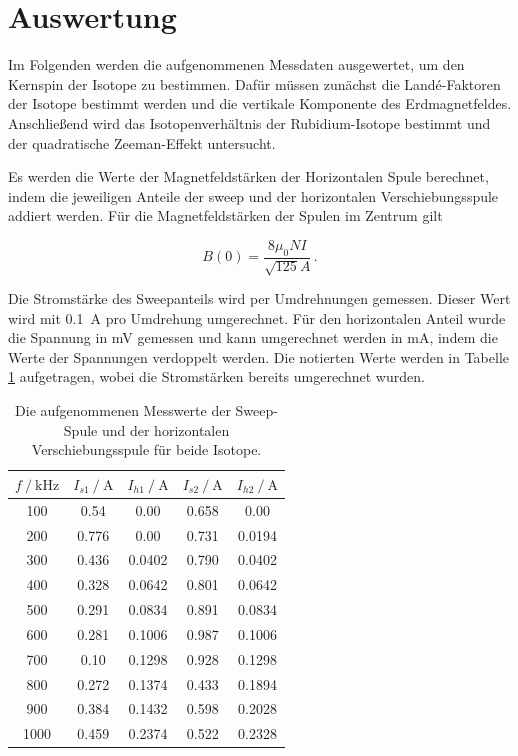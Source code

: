 \section{Auswertung}
\label{sec:auswertung}

Im Folgenden werden die aufgenommenen Messdaten ausgewertet, um den Kernspin der Isotope zu bestimmen.
Dafür müssen zunächst die Landé-Faktoren der Isotope bestimmt werden und die vertikale Komponente des Erdmagnetfeldes.
Anschließend wird das Isotopenverhältnis der Rubidium-Isotope bestimmt und der quadratische Zeeman-Effekt untersucht.

Es werden die Werte der Magnetfeldstärken der Horizontalen Spule berechnet, indem die jeweiligen Anteile der sweep und der
horizontalen Verschiebungsspule addiert werden.
Für die Magnetfeldstärken der Spulen im Zentrum gilt

\begin{equation}
    B(0) = \frac{8  \mu_0  N I}{\sqrt{125} A}  \, .
    \label{eqn:magnetfeld}
\end{equation}

Die Stromstärke des Sweepanteils wird per Umdrehnungen gemessen.
Dieser Wert wird mit \qty{0.1}{\ampere} pro Umdrehung umgerechnet.
Für den horizontalen Anteil wurde die Spannung in \unit{\milli\volt} gemessen und kann umgerechnet werden in \unit{\milli\ampere},
indem die Werte der Spannungen verdoppelt werden.
Die notierten Werte werden in Tabelle \ref{tab:magnetfeldstärken} aufgetragen, wobei die Stromstärken bereits umgerechnet wurden.

\begin{table}
    \centering
    \caption{Die aufgenommenen Messwerte der Sweep-Spule und der horizontalen Verschiebungsspule für beide Isotope.}
    \label{tab:magnetfeldstärken}
    \begin{tabular}{c c c c c}
        \toprule
        $f \mathbin{/} \mathrm{kHz} $& $I_{s1} \mathbin{/} \unit{\ampere}$ & $I_{h1} \mathbin{/} \unit{\ampere}$ & $I_{s2} \mathbin{/} \unit{\ampere}$ & $I_{h2} \mathbin{/} \unit{\ampere}$ \\
        \midrule
        100 & 0.54 & 0.00 & 0.658 & 0.00 \\
        200 & 0.776 & 0.00 & 0.731 & 0.0194 \\
        300 & 0.436 & 0.0402 & 0.790 & 0.0402 \\
        400 & 0.328 & 0.0642 & 0.801 & 0.0642 \\
        500 & 0.291 & 0.0834 & 0.891 & 0.0834 \\
        600 & 0.281 & 0.1006 & 0.987 & 0.1006 \\
        700 & 0.10 & 0.1298 & 0.928 & 0.1298 \\
        800 & 0.272 & 0.1374 & 0.433 & 0.1894 \\
        900 & 0.384 & 0.1432 & 0.598 & 0.2028 \\
        1000 & 0.459 & 0.2374 & 0.522 & 0.2328 \\
        \bottomrule
    \end{tabular}
\end{table}

